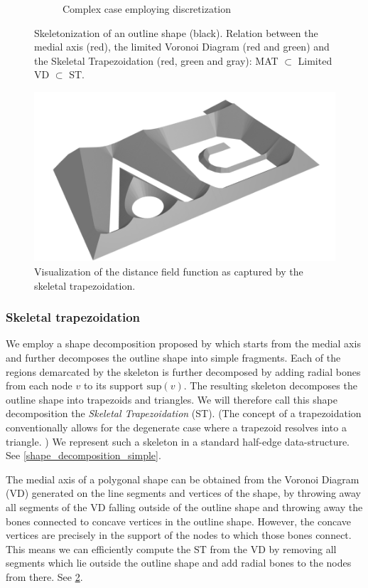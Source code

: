\begin{figure}
\begin{subfigure}{0.65\columnwidth}
\caption{Complex case employing discretization}
\label{shape_decomp_complex}
\end{subfigure}
\caption{
Skeletonization of an outline shape (black).
Relation between the medial axis (red), the limited Voronoi Diagram (red and green) and the Skeletal Trapezoidation (red, green and gray): MAT $\subset$ Limited VD $\subset$ ST.
}
\label{skeletonization_comparison}
\end{figure}


\begin{figure} \centering
\includegraphics[width=.75\columnwidth]{sources/method/mat_3d_blender_render.png}
\caption{
Visualization of the distance field function as captured by the skeletal trapezoidation.
}
\label{mat_3d}
\end{figure}



\subsubsection{Skeletal trapezoidation}
We employ a shape decomposition proposed by \citeauthor{Ding2016a} which starts from the medial axis and further decomposes the outline shape into simple fragments. \cite{Ding2016a}
Each of the regions demarcated by the skeleton is further decomposed by adding radial bones from each node $v$ to its support $\text{sup}(v)$.
The resulting skeleton decomposes the outline shape into trapezoids and triangles.
We will therefore call this shape decomposition the \emph{Skeletal Trapezoidation} (ST).
(The concept of a trapezoidation conventionally allows for the degenerate case where a trapezoid resolves into a triangle. \cite{chazelle1984,fournier1984})
We represent such a skeleton in a standard half-edge data-structure.
See \cref{shape_decomposition_simple}.


The medial axis of a polygonal shape can be obtained from the Voronoi Diagram (VD) generated on the line segments and vertices of the shape, by throwing away all segments of the VD falling outside of the outline shape and throwing away the bones connected to concave vertices in the outline shape. \cite{lee1982medial}
However, the concave vertices are precisely in the support of the nodes to which those bones connect.
This means we can efficiently compute the ST from the VD by removing all segments which lie outside the outline shape and add radial bones to the nodes from there.
See \cref{skeletonization_comparison}.


